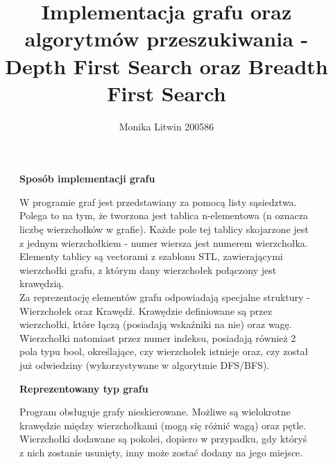 \documentclass[a4paper,11pt]{report}
\title{Implementacja grafu oraz algorytmów przeszukiwania - Depth First Search oraz Breadth First Search}
\author{Monika Litwin 200586}
\begin{document}
\maketitle

\begin{figure}
  \begin{center}
  \textbf{Sposób implementacji grafu}
\\
\begin{flushleft}

W programie graf jest przedstawiany za pomocą listy sąsiedztwa. Polega to na tym, że tworzona jest tablica n-elementowa (n oznacza liczbę wierzchołków w grafie). Każde pole tej tablicy skojarzone jest z jednym wierzchołkiem - numer wiersza jest numerem wierzchołka. Elementy tablicy są vectorami z szablonu STL, zawierającymi wierzchołki grafu, z którym dany wierzchołek połączony jest krawędzią.
\\
Za reprezentację elementów grafu odpowiadają specjalne struktury - Wierzchołek oraz Krawędź. Krawędzie definiowane są przez wierzchołki, które łączą (posiadają wskaźniki na nie) oraz wagę. Wierzchołki natomiast przez numer indeksu, posiadają również 2 pola typu bool, określające, czy wierzchołek istnieje oraz, czy został już odwiedziny (wykorzystywane w algorytmie DFS/BFS).

\end{flushleft}
  \end{center}
\end{figure}

\begin{figure}
  \begin{center}
  \textbf{Reprezentowany typ grafu}
\\
\begin{flushleft}

Program obsługuje grafy nieskierowane. Możliwe są wielokrotne krawędzie między wierzchołkami (mogą się różnić wagą) oraz pętle. Wierzchołki dodawane są pokolei, dopiero w przypadku, gdy któryś z nich zostanie usunięty, inny może zostać dodany na jego miejsce.

\end{flushleft}
  \end{center}
\end{figure}
\end{document}
